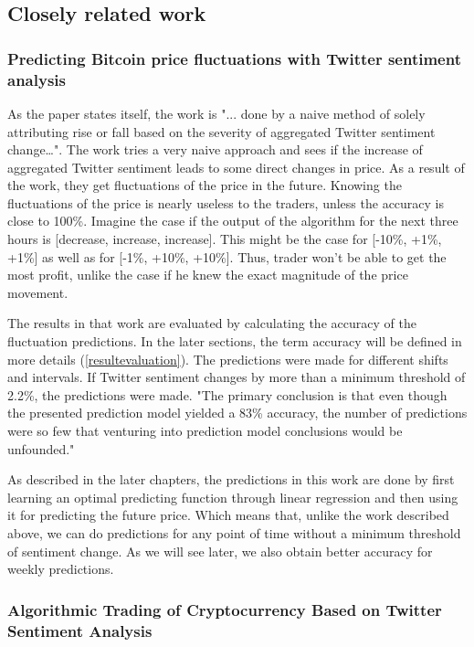 \documentclass[a4paper,11pt,oneside]{article}
\begin{document}
  \subsection{Closely related work}
  
  \subsubsection{Predicting Bitcoin price fluctuations with Twitter sentiment analysis \cite{related1}}
  
  As the paper states itself, the work is "... done by a naive method of solely attributing rise or fall based on the severity of aggregated Twitter sentiment change…". The work tries a very naive approach and sees if the increase of aggregated Twitter sentiment leads to some direct changes in price. As a result of the work, they get fluctuations of the price in the future. \cite{related1} Knowing the fluctuations of the price is nearly useless to the traders, unless the accuracy is close to 100\%. Imagine the case if the output of the algorithm for the next three hours is [decrease, increase, increase]. This might be the case for [-10\%, +1\%, +1\%] as well as for [-1\%, +10\%, +10\%]. Thus, trader won't be able to get the most profit, unlike the case if he knew the exact magnitude of the price movement.
  
  The results in that work are evaluated by calculating the accuracy of the fluctuation predictions. In the later sections, the term accuracy will be defined in more details (\ref{resultevaluation}). The predictions were made for different shifts and intervals. If Twitter sentiment changes by more than a minimum threshold of 2.2\%, the predictions were made. "The primary conclusion is that even though the presented prediction model yielded a 83\% accuracy, the number of predictions were so few that venturing into prediction model conclusions would be unfounded." \cite{related1}
  
  As described in the later chapters, the predictions in this work are done by first learning an optimal predicting function through linear regression and then using it for predicting the future price. Which means that, unlike the work described above, we can do predictions for any point of time without a minimum threshold of sentiment change. As we will see later, we also obtain better accuracy for weekly predictions.
  
  \subsubsection{Algorithmic Trading of Cryptocurrency Based on Twitter Sentiment Analysis \cite{related2}}
  
\end{document}
